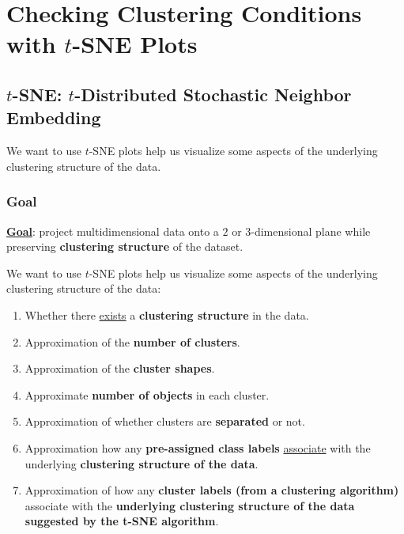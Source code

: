 \documentclass[11pt]{elegantbook}
\begin{document}
\chapter{Checking Clustering
Conditions with $t$-SNE Plots}
\section{$t$-SNE: $t$-Distributed Stochastic Neighbor Embedding}

We want to use $t$-SNE plots help us visualize some aspects of the underlying clustering structure of the data.

\subsection{Goal}
\textbf{\underline{Goal}}: project multidimensional data onto a $2$ or $3$-dimensional plane while preserving \textbf{clustering structure} of the dataset.

We want to use $t$-SNE plots help us visualize some aspects of the underlying clustering structure of the data:
\begin{enumerate}
    \item Whether there \underline{exists} a \textbf{clustering structure} in the data.
    \item Approximation of the \textbf{number of clusters}.
    \item Approximation of the \textbf{cluster shapes}.
    \item Approximate \textbf{number of objects} in each cluster.
    \item Approximation of whether clusters are
    \textbf{separated} or not.
    \item Approximation how any \textbf{pre-assigned class labels} \underline{associate} with the underlying \textbf{clustering structure of the data}.
    \item Approximation of how any \textbf{cluster labels (from a clustering algorithm)} associate with the \textbf{underlying clustering structure of the data suggested by the t-SNE algorithm}.
\end{enumerate}
\end{document}
